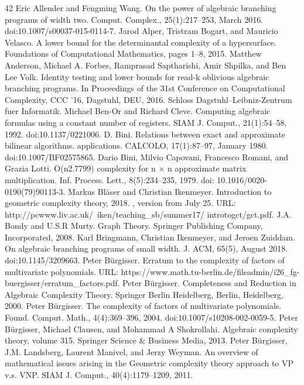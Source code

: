 \documentclass[10pt,a4paper]{article}
\begin{document}
\begin{thebibliography}{42}
 Eric Allender and Fengming Wang. On the power of algebraic branching programs of width two. Comput. Complex., 25(1):217–253, March 2016. doi:10.1007/s00037-015-0114-7.
 Jarod Alper, Tristram Bogart, and Mauricio Velasco. A lower bound for the determinantal complexity of a hypersurface. Foundations of Computational Mathematics, pages 1–8, 2015.
 Matthew Anderson, Michael A. Forbes, Ramprasad Saptharishi, Amir Shpilka, and Ben Lee Volk. Identity testing and lower bounds for read-k oblivious algebraic branching programs. In Proceedings of the 31st Conference on Computational Complexity, CCC ’16, Dagstuhl, DEU, 2016. Schloss Dagstuhl–Leibniz-Zentrum fuer Informatik.
 Michael Ben-Or and Richard Cleve. Computing algebraic formulas using a constant number of registers. SIAM J. Comput., 21(1):54–58, 1992. doi:10.1137/0221006.
 D. Bini. Relations between exact and approximate bilinear algorithms. applications. CALCOLO, 17(1):87–97, January 1980. doi:10.1007/BF02575865.
 Dario Bini, Milvio Capovani, Francesco Romani, and Grazia Lotti. O(n2.7799) complexity for n × n approximate matrix multiplication. Inf. Process. Lett., 8(5):234–235, 1979. doi: 10.1016/0020-0190(79)90113-3.
 Markus Bläser and Christian Ikenmeyer. Introduction to geometric complexity theory, 2018. , version from July 25. URL: http://pcwww.liv.ac.uk/~iken/teaching\_sb/summer17/ introtogct/gct.pdf.
 J.A. Bondy and U.S.R Murty. Graph Theory. Springer Publishing Company, Incorporated, 2008.
 Karl Bringmann, Christian Ikenmeyer, and Jeroen Zuiddam. On algebraic branching programs of small width. J. ACM, 65(5), August 2018. doi:10.1145/3209663.
 Peter Bürgisser. Erratum to the complexity of factors of multivariate polynomials. URL: https://www.math.tu-berlin.de/fileadmin/i26\_fg-buergisser/erratum\_factors.pdf.
 Peter Bürgisser. Completeness and Reduction in Algebraic Complexity Theory. Springer Berlin Heidelberg, Berlin, Heidelberg, 2000.
 Peter Bürgisser. The complexity of factors of multivariate polynomials. Found. Comput. Math., 4(4):369–396, 2004. doi:10.1007/s10208-002-0059-5.
 Peter Bürgisser, Michael Clausen, and Mohammad A Shokrollahi. Algebraic complexity theory, volume 315. Springer Science \& Business Media, 2013.
 Peter Bürgisser, J.M. Landsberg, Laurent Manivel, and Jerzy Weyman. An overview of mathematical issues arising in the Geometric complexity theory approach to VP v.s. VNP. SIAM J. Comput., 40(4):1179–1209, 2011.

\end{thebibliography}
\end{document}
